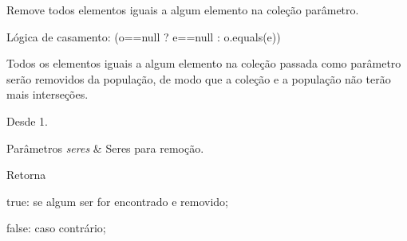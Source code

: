 Remove todos elementos iguais a algum elemento na coleção parâmetro. 

Lógica de casamento\-: (o==null ? e==null \-: o.\-equals(e)) 

Todos os elementos iguais a algum elemento na coleção passada como parâmetro serão removidos da população, de modo que a coleção e a população não terão mais interseções. 

\begin{DoxySince}{Desde}
1. 
\end{DoxySince}

\begin{DoxyParams}{Parâmetros}
{\em seres} & Seres para remoção. \\
\hline
\end{DoxyParams}
\begin{DoxyReturn}{Retorna}

\begin{DoxyItemize}
\item true\-: se algum ser for encontrado e removido; 
\item false\-: caso contrário; 
\end{DoxyItemize}
\end{DoxyReturn}

